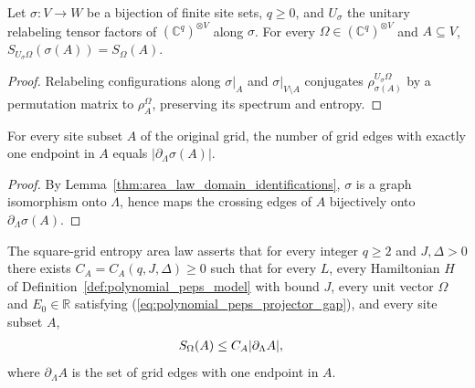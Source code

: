 \begin{lemma}
    \label{thm:finite_product_entropy_relabel}
    \leanok
    Let $\sigma:V\to W$ be a bijection of finite site sets, $q\ge0$, and
    $U_\sigma$ the unitary relabeling tensor factors of $(\mathbb C^q)^{\otimes V}$
    along $\sigma$. For every $\Omega\in(\mathbb C^q)^{\otimes V}$ and
    $A\subseteq V$, $S_{U_\sigma\Omega}(\sigma(A))=S_\Omega(A)$.
\end{lemma}
\begin{proof}\leanok
    Relabeling configurations along $\sigma|_{A}$ and $\sigma|_{V\setminus A}$
    conjugates $\rho_{\sigma(A)}^{U_\sigma\Omega}$ by a permutation matrix to
    $\rho_A^\Omega$, preserving its spectrum and entropy.
\end{proof}

\begin{lemma}
    \label{thm:square_edge_boundary_card}
    \leanok
    For every site subset $A$ of the original grid, the number of grid edges
    with exactly one endpoint in $A$ equals $|\partial_\Lambda\sigma(A)|$.
\end{lemma}
\begin{proof}\leanok
    By Lemma~\ref{thm:area_law_domain_identifications}, $\sigma$ is a graph
    isomorphism onto $\Lambda$, hence maps the crossing edges of $A$ bijectively
    onto $\partial_\Lambda\sigma(A)$.
\end{proof}

\begin{definition}
    \label{def:square_entropy_area_law}
    \leanok
    The square-grid entropy area law asserts that for every integer $q\ge2$ and
    $J,\Delta>0$ there exists $C_A=C_A(q,J,\Delta)\ge0$ such that for every $L$,
    every Hamiltonian $H$ of Definition~\ref{def:polynomial_peps_model} with
    bound $J$, every unit vector $\Omega$ and $E_0\in\mathbb R$ satisfying
    (\ref{eq:polynomial_peps_projector_gap}), and every site subset $A$,
    \begin{align}
        S_\Omega(A) & \le C_A|\partial_\Lambda A|,\notag
    \end{align}
    where $\partial_\Lambda A$ is the set of grid edges with one endpoint in $A$.
\end{definition}

